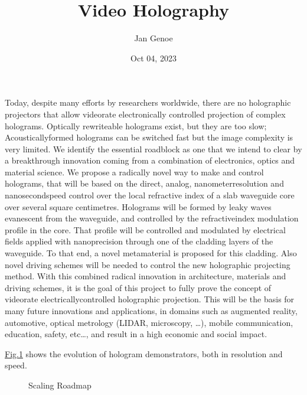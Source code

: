 \documentclass[a4paper,10pt,english,openany,oneside]{jupyterBook}
\title{Video Holography}
\date{Oct 04, 2023}
\author{Jan Genoe}
\begin{document}
\pagestyle{empty}
\sphinxmaketitle
\pagestyle{plain}
\sphinxtableofcontents
\pagestyle{normal}
\label{\detokenize{intro2::doc}}


\begin{DUlineblock}{0em}
\item[] 
\end{DUlineblock}

\sphinxAtStartPar
Today, despite many efforts by researchers world\sphinxhyphen{}wide, there are no holographic projectors that allow video\sphinxhyphen{}rate electronically controlled projection of complex holograms. Optically re\sphinxhyphen{}write\sphinxhyphen{}able holograms exist, but they are too slow; Acoustically\sphinxhyphen{}formed holograms can be switched fast but the image complexity is very limited. We identify the essential roadblock as one that we intend to clear by a breakthrough innovation coming from a combination of electronics, optics and material science.
We propose a radically novel way to make and control holograms, that will be based on the direct, analog, nanometer\sphinxhyphen{}resolution and nanosecond\sphinxhyphen{}speed control over the local refractive index of a slab waveguide core over several square centimetres. Holograms will be formed by leaky waves evanescent from the waveguide, and controlled by the refractive\sphinxhyphen{}index modulation profile in the core. That profile will be controlled and modulated by electrical fields applied with nano\sphinxhyphen{}precision through one of the cladding layers of the waveguide. To that end, a novel metamaterial is proposed for this cladding. Also novel driving schemes will be needed to control the new holographic projecting method.
With this combined radical innovation in architecture, materials and driving schemes, it is the goal of this project to fully prove the concept of video\sphinxhyphen{}rate electrically\sphinxhyphen{}controlled holographic projection. This will be the basis for many future innovations and applications, in domains such as augmented reality, automotive, optical metrology (LIDAR, microscopy, …), mobile communication, education, safety, etc…, and result in a high economic and social impact.

\sphinxAtStartPar
\hyperref[\detokenize{intro2:scalingroadmap}]{Fig.\@ \ref{\detokenize{intro2:scalingroadmap}}} shows the evolution of hologram demonstrators, both in resolution and speed.

\begin{figure}[htbp]
\centering
\capstart

\noindent{}
\caption{Scaling Roadmap}\label{\detokenize{intro2:scalingroadmap}}\end{figure}
\end{document}
